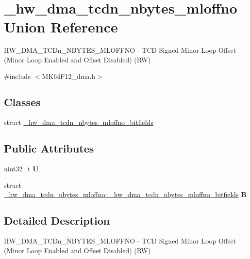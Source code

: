 \hypertarget{union__hw__dma__tcdn__nbytes__mloffno}{}\section{\+\_\+hw\+\_\+dma\+\_\+tcdn\+\_\+nbytes\+\_\+mloffno Union Reference}
\label{union__hw__dma__tcdn__nbytes__mloffno}


H\+W\+\_\+\+D\+M\+A\+\_\+\+T\+C\+Dn\+\_\+\+N\+B\+Y\+T\+E\+S\+\_\+\+M\+L\+O\+F\+F\+NO -\/ T\+CD Signed Minor Loop Offset (Minor Loop Enabled and Offset Disabled) (RW)  




{\ttfamily \#include $<$M\+K64\+F12\+\_\+dma.\+h$>$}

\subsection*{Classes}
\begin{DoxyCompactItemize}
\item 
struct \hyperlink{struct__hw__dma__tcdn__nbytes__mloffno_1_1__hw__dma__tcdn__nbytes__mloffno__bitfields}{\+\_\+hw\+\_\+dma\+\_\+tcdn\+\_\+nbytes\+\_\+mloffno\+\_\+bitfields}
\end{DoxyCompactItemize}
\subsection*{Public Attributes}
\begin{DoxyCompactItemize}
\item 
uint32\+\_\+t {\bfseries U}\hypertarget{union__hw__dma__tcdn__nbytes__mloffno_aa6b223a6b679587412064af35248454c}{}\label{union__hw__dma__tcdn__nbytes__mloffno_aa6b223a6b679587412064af35248454c}

\item 
struct \hyperlink{struct__hw__dma__tcdn__nbytes__mloffno_1_1__hw__dma__tcdn__nbytes__mloffno__bitfields}{\+\_\+hw\+\_\+dma\+\_\+tcdn\+\_\+nbytes\+\_\+mloffno\+::\+\_\+hw\+\_\+dma\+\_\+tcdn\+\_\+nbytes\+\_\+mloffno\+\_\+bitfields} {\bfseries B}\hypertarget{union__hw__dma__tcdn__nbytes__mloffno_a6fcd00d4ffe9a0d00504accafbce31bd}{}\label{union__hw__dma__tcdn__nbytes__mloffno_a6fcd00d4ffe9a0d00504accafbce31bd}

\end{DoxyCompactItemize}


\subsection{Detailed Description}
H\+W\+\_\+\+D\+M\+A\+\_\+\+T\+C\+Dn\+\_\+\+N\+B\+Y\+T\+E\+S\+\_\+\+M\+L\+O\+F\+F\+NO -\/ T\+CD Signed Minor Loop Offset (Minor Loop Enabled and Offset Disabled) (RW) 

